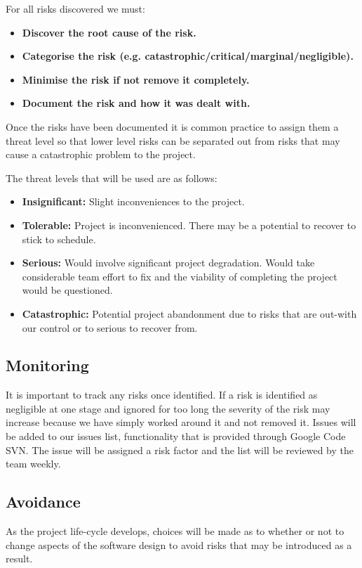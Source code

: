\documentclass{l3proj}
\begin{document}
For all risks discovered we must:
\begin{itemize}
\item{\textbf{Discover the root cause of the risk.}}
\item{\textbf{Categorise the risk (e.g. catastrophic/critical/marginal/negligible).}}
\item{\textbf{Minimise the risk if not remove it completely.}}
\item{\textbf{Document the risk and how it was dealt with.}}
\end{itemize}

Once the risks have been documented it is common practice to assign them a
threat level so that lower level risks can be separated out from risks that may
cause a catastrophic problem to the project.

The threat levels that will be used are as follows:
\begin{itemize}
\item{\textbf{Insignificant:} Slight inconveniences to the project.}
\item{\textbf{Tolerable:} Project is inconvenienced. There may be a potential to recover to stick to schedule.}
\item{\textbf{Serious:} Would involve significant project degradation. Would
		take considerable team effort to fix and the viability of completing the
		project would be questioned.}
\item{\textbf{Catastrophic:} Potential project abandonment due to risks that are out-with our control or to serious to recover from.}
\end{itemize}


\subsection{Monitoring}
It is important to track any risks once identified. If a risk is identified as
negligible at one stage and ignored for too long the severity of the risk may
increase because we have simply worked around it and not removed it. Issues
will be added to our issues list, functionality that is provided through Google
Code SVN. The issue will be assigned a risk factor and the list will be
reviewed by the team weekly.

\subsection{Avoidance}
As the project life-cycle develops, choices will be made as to whether or not
to change aspects of the software design to avoid risks that may be introduced
as a result. 
\end{document}
